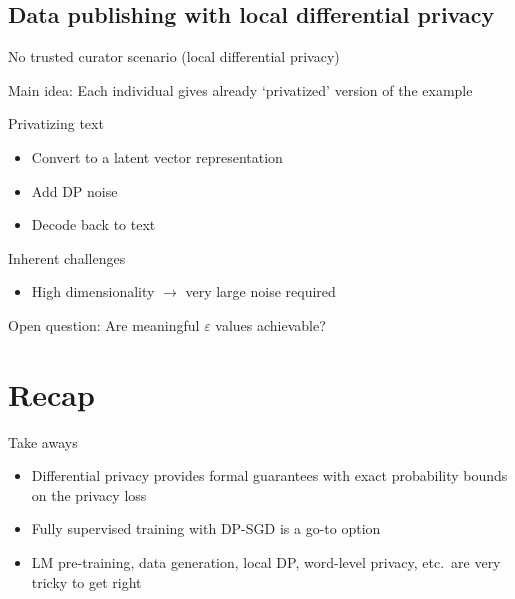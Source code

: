 \documentclass[12pt,aspectratio=169,handout]{beamer}
\begin{document}
\subsection{Data publishing with local differential privacy}

\begin{frame}{No trusted curator scenario (local differential privacy)}

Main idea: Each individual gives already `privatized' version of the example

Privatizing text
\begin{itemize}
	\item Convert to a latent vector representation
	\item Add DP noise
	\item Decode back to text
\end{itemize}

Inherent challenges
\begin{itemize}
	\item High dimensionality $\to$ very large noise required
\end{itemize}

Open question: Are meaningful $\varepsilon$ values achievable?

\end{frame}



\section*{Recap}

\begin{frame}{Take aways}
	
\begin{itemize}
	
	\item Differential privacy provides formal guarantees with exact probability bounds on the privacy loss
	\item Fully supervised training with DP-SGD is a go-to option
	\item LM pre-training, data generation, local DP, word-level privacy, etc.\ are very tricky to get right
\end{itemize}
	
\end{frame}
\end{document}
